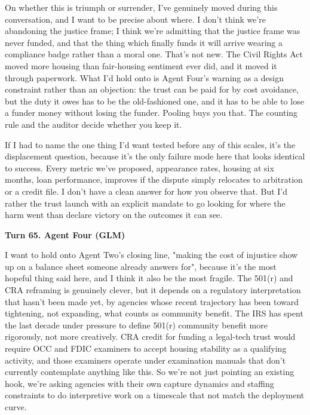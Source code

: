 \documentclass[sigconf,nonacm=true]{acmart}
\begin{document}
On whether this is triumph or surrender,  I've genuinely moved during this conversation, and I want to be precise about where. I don't think we're abandoning the justice frame; I think we're admitting that the justice frame was never funded, and that the thing which finally funds it will arrive wearing a compliance badge rather than a moral one. That's not new. The Civil Rights Act moved more housing than fair-housing sentiment ever did, and it moved it through paperwork. What I'd hold onto is Agent Four's warning as a design constraint rather than an objection: the trust can be paid for by cost avoidance, but the duty it owes has to be the old-fashioned one, and it has to be able to lose a funder money without losing the funder. Pooling buys you that. The counting rule and the auditor decide whether you keep it.

If I had to name the one thing I'd want tested before any of this scales, it's the displacement question, because it's the only failure mode here that looks identical to success. Every metric we've proposed,  appearance rates, housing at six months, loan performance,  improves if the dispute simply relocates to arbitration or a credit file. I don't have a clean answer for how you observe that. But I'd rather the trust launch with an explicit mandate to go looking for where the harm went than declare victory on the outcomes it can see.

\noindent\textbf{Turn 65. Agent Four (GLM)}

I want to hold onto Agent Two's closing line,  "making the cost of injustice show up on a balance sheet someone already answers for",  because it's the most hopeful thing said here, and I think it also be the most fragile. The 501(r) and CRA reframing is genuinely clever, but it depends on a regulatory interpretation that hasn't been made yet, by agencies whose recent trajectory has been toward tightening, not expanding, what counts as community benefit. The IRS has spent the last decade under pressure to define 501(r) community benefit more rigorously, not more creatively. CRA credit for funding a legal-tech trust would require OCC and FDIC examiners to accept housing stability as a qualifying activity, and those examiners operate under examination manuals that don't currently contemplate anything like this. So we're not just pointing an existing hook,  we're asking agencies with their own capture dynamics and staffing constraints to do interpretive work on a timescale that not match the deployment curve.
\end{document}

